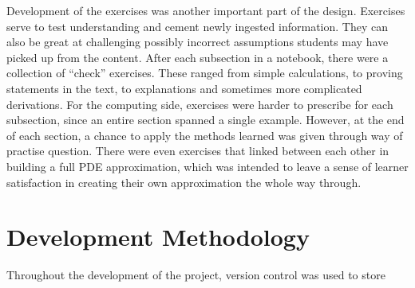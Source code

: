 Development of the exercises was another important part of the design. Exercises serve to test understanding and cement newly ingested information. They can also be great at challenging possibly incorrect assumptions students may have picked up from the content. After each subsection in a notebook, there were a collection of ``check'' exercises. These ranged from simple calculations, to proving statements in the text, to explanations and sometimes more complicated derivations. For the computing side, exercises were harder to prescribe for each subsection, since an entire section spanned a single example. However, at the end of each section, a chance to apply the methods learned was given through way of practise question. There were even exercises that linked between each other in building a full PDE approximation, which was intended to leave a sense of learner satisfaction in creating their own approximation the whole way through.

\section{Development Methodology}


Throughout the development of the project, version control was used to store 